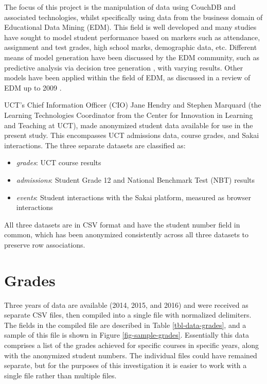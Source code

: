 The focus of this project is the manipulation of data using CouchDB and associated technologies, whilst specifically using data from the business domain of Educational Data Mining (EDM). This field is well developed and many studies have sought to model student performance based on markers such as attendance, assignment and test grades, high school marks, demographic data, etc. Different means of model generation have been discussed by the EDM community, such as predictive analysis via decision tree generation \cite{Qasem20016,Balestra2017,casper2017,Dimitris,zebun2005,Mierle:2005}, with varying results. Other models have been applied within the field of EDM, as discussed in a review of EDM up to 2009 \cite{bakerEdMiningSummary}.

UCT’s Chief Information Officer (CIO) Jane Hendry and Stephen Marquard (the Learning Technologies Coordinator from the Center for Innovation in Learning and Teaching at UCT), made anonymized student data available for use in the present study. This encompasses UCT admissions data, course grades, and Sakai interactions. The three separate datasets are classified as:

\begin{itemize}
    \item \textit{grades}: UCT course results
    \item \textit{admissions}: Student Grade 12 and National Benchmark Test (NBT) results
    \item \textit{events}: Student interactions with the Sakai platform, measured as browser interactions
\end{itemize}

All three datasets are in CSV format and have the student number field in common, which has been anonymized consistently across all three datasets to preserve row associations.

\section{Grades}
Three years of data are available (2014, 2015, and 2016) and were received as separate CSV files, then compiled into a single file with normalized delimiters. The fields in the compiled file are described in Table \ref{tbl-data-grades}, and a sample of this file is shown in Figure \ref{fig-sample-grades}. Essentially this data comprises a list of the grades achieved for specific courses in specific years, along with the anonymized student numbers. The individual files could have remained separate, but for the purposes of this investigation it is easier to work with a single file rather than multiple files.

